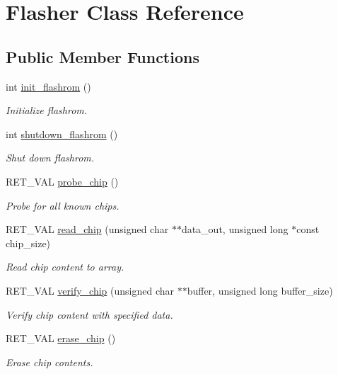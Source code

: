 \hypertarget{classFlasher}{\section{Flasher Class Reference}
\label{classFlasher}
}
\subsection*{Public Member Functions}
\begin{DoxyCompactItemize}
\item 
int \hyperlink{classFlasher_ad41b2dded5ee4422a204470d34785670}{init\-\_\-flashrom} ()
\begin{DoxyCompactList}\small\item\em Initialize flashrom. \end{DoxyCompactList}\item 
int \hyperlink{classFlasher_ae7358cf483ac7c1460e87e0825ac0374}{shutdown\-\_\-flashrom} ()
\begin{DoxyCompactList}\small\item\em Shut down flashrom. \end{DoxyCompactList}\item 
R\-E\-T\-\_\-\-V\-A\-L \hyperlink{classFlasher_ab91e98b53e9d227e6dc973df0e4171de}{probe\-\_\-chip} ()
\begin{DoxyCompactList}\small\item\em Probe for all known chips. \end{DoxyCompactList}\item 
R\-E\-T\-\_\-\-V\-A\-L \hyperlink{classFlasher_aa216f16d2fc46faee3bde07c05d91260}{read\-\_\-chip} (unsigned char $\ast$$\ast$data\-\_\-out, unsigned long $\ast$const chip\-\_\-size)
\begin{DoxyCompactList}\small\item\em Read chip content to array. \end{DoxyCompactList}\item 
R\-E\-T\-\_\-\-V\-A\-L \hyperlink{classFlasher_a333de6a14a78764fddd2ffcdf38980f4}{verify\-\_\-chip} (unsigned char $\ast$$\ast$buffer, unsigned long buffer\-\_\-size)
\begin{DoxyCompactList}\small\item\em Verify chip content with specified data. \end{DoxyCompactList}\item 
R\-E\-T\-\_\-\-V\-A\-L \hyperlink{classFlasher_a0c680da97e2089e9acb5e306b7831a25}{erase\-\_\-chip} ()
\begin{DoxyCompactList}\small\item\em Erase chip contents. \end{DoxyCompactList}\item 

\end{DoxyCompactItemize}
